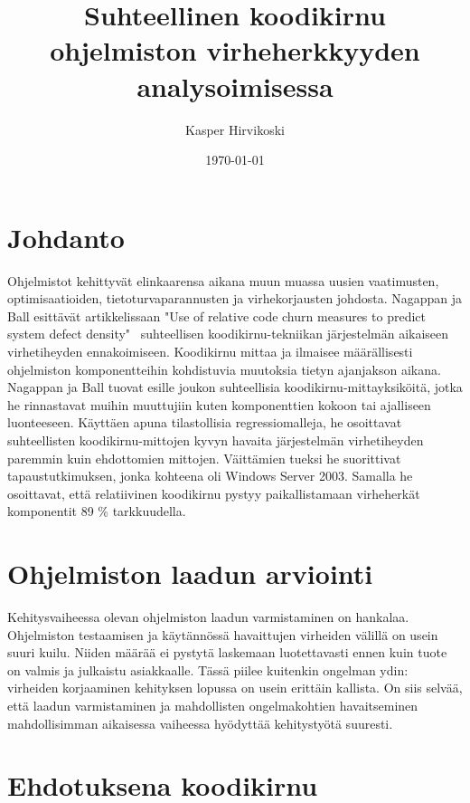 \documentclass[finnish]{../tktltiki2}
\title{Suhteellinen koodikirnu ohjelmiston virheherkkyyden\\analysoimisessa}
\author{Kasper Hirvikoski}
\date{\today}
\theoremstyle{definition}
\theoremstyle{remark}
\begin{document}

\maketitle

\tableofcontents
\newpage


\section{Johdanto}

Ohjelmistot kehittyvät elinkaarensa aikana muun muassa uusien vaatimusten, optimisaatioiden, tietoturvaparannusten ja virhekorjausten johdosta. Nagappan ja Ball esittävät artikkelissaan "Use of relative code churn measures to predict system defect density"~\cite{NB05} suhteellisen koodikirnu-tekniikan järjestelmän aikaiseen virhetiheyden ennakoimiseen. Koodikirnu mittaa ja ilmaisee määrällisesti ohjelmiston komponentteihin kohdistuvia muutoksia tietyn ajanjakson aikana. Nagappan ja Ball tuovat esille joukon suhteellisia koodikirnu-mittayksiköitä, jotka he rinnastavat muihin muuttujiin kuten komponenttien kokoon tai ajalliseen luonteeseen. Käyttäen apuna tilastollisia regressiomalleja, he osoittavat suhteellisten koodikirnu-mittojen kyvyn havaita järjestelmän virhetiheyden paremmin kuin ehdottomien mittojen. Väittämien tueksi he suorittivat tapaustutkimuksen, jonka kohteena oli Windows Server 2003. Samalla he osoittavat, että relatiivinen koodikirnu pystyy paikallistamaan virheherkät komponentit 89 \% tarkkuudella.

\section{Ohjelmiston laadun arviointi}

Kehitysvaiheessa olevan ohjelmiston laadun varmistaminen on hankalaa. Ohjelmiston testaamisen ja käytännössä havaittujen virheiden välillä on usein suuri kuilu. Niiden määrää ei pystytä laskemaan luotettavasti ennen kuin tuote on valmis ja julkaistu asiakkaalle. Tässä piilee kuitenkin ongelman ydin: virheiden korjaaminen kehityksen lopussa on usein erittäin kallista. On siis selvää, että laadun varmistaminen ja mahdollisten ongelmakohtien havaitseminen mahdollisimman aikaisessa vaiheessa hyödyttää kehitystyötä suuresti.

\section{Ehdotuksena koodikirnu}
\end{document}
